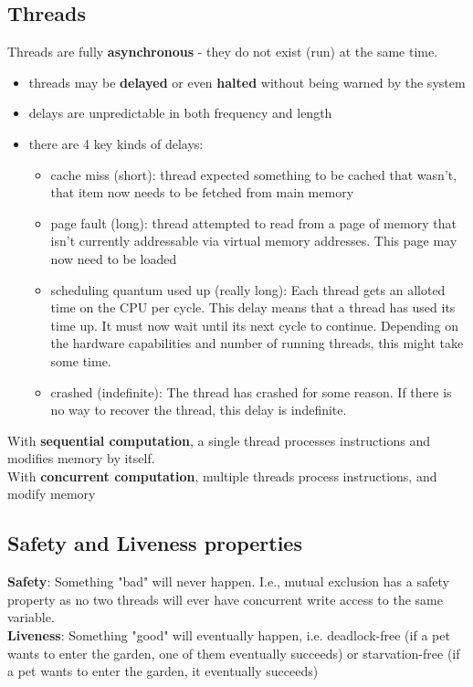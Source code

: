 \documentclass{article}
\begin{document}
\subsection{Threads}
Threads are fully \textbf{asynchronous} - they do not exist (run) at the same time.
\begin{itemize}
    \item threads may be \textbf{delayed} or even \textbf{halted} without being warned by the system
    \item delays are unpredictable in both frequency and length
    \item there are 4 key kinds of delays:
    \begin{itemize}
        \item cache miss (short): thread expected something to be cached that wasn't, that item now needs to be fetched from main memory
        \item page fault (long): thread attempted to read from a page of memory that isn't currently addressable via virtual memory addresses. This page may now need to be loaded
        \item scheduling quantum used up (really long): Each thread gets an alloted time on the CPU per cycle. This delay means that a thread has used its time up. It must now wait until its next cycle to continue. Depending on the hardware capabilities and number of running threads, this might take some time.
        \item crashed (indefinite): The thread has crashed for some reason. If there is no way to recover the thread, this delay is indefinite.
    \end{itemize}
\end{itemize}
With \textbf{sequential computation}, a single thread processes instructions and modifies memory by itself.
\\With \textbf{concurrent computation}, multiple threads process instructions, and modify memory

\subsection{Safety and Liveness properties}
\textbf{Safety}: Something "bad" will never happen. I.e., mutual exclusion has a safety property as no two threads will ever have concurrent write access to the same variable.
\\\textbf{Liveness}: Something "good" will eventually happen, i.e. deadlock-free (if a pet wants to enter the garden, one of them eventually succeeds) or starvation-free (if a pet wants to enter the garden, it eventually succeeds)
\end{document}
